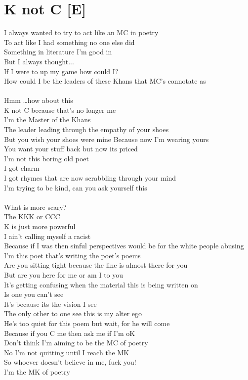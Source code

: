 \documentclass[12pt, b5paper, oneside]{book}
\begin{document}
\section{K not C [E]}
I always wanted to try to act like an MC in poetry
\\To act like I had something no one else did
\\Something in literature I'm good in
\\But I always thought...
\\If I were to up my game how could I?
\\How could I be the leaders of these Khans that MC's connotate as
%
\\\\Hmm \dots how about this
\\K not C because that's no longer me
\\I'm the Master of the Khans
\\The leader leading through the empathy of your shoes
\\But you wish your shoes were mine Because now I'm wearing yours
\\You want your stuff back but now its priced
\\I'm not this boring old poet
\\I got charm
\\I got rhymes that are now scrabbling through your mind
\\I'm trying to be kind, can you ask yourself this
%
\\\\What is more scary?
\\The KKK or CCC
\\K is just more powerful
\\I ain't calling myself a racist
\\Because if I was then sinful perspectives would be for the white people abusing
\\I'm this poet that's writing the poet's poems
\\Are you sitting tight because the line is almost there for you
\\But are you here for me or am I to you
%
\\It's getting confusing when the material this is being written on
\\Is one you can't see
\\It's because its the vision I see
\\The only other to one see this is my alter ego
\\He's too quiet for this poem but wait, for he will come
\\Because if you C me then ask me if I'm oK
\\Don't think I'm aiming to be the MC of poetry
\\No I'm not quitting until I reach the MK
\\So whoever doesn't believe in me, fuck you!
\\I'm the MK of poetry 
\newpage
\end{document}
